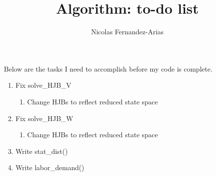 \documentclass[12pt,english]{article}
\theoremstyle{remark}
\begin{document}
\title{Algorithm: to-do list}
\author{Nicolas Fernandez-Arias}
\maketitle

Below are the tasks I need to accomplish before my code is complete.

\begin{enumerate}
	\item Fix solve\_HJB\_V
	\begin{enumerate}
		\item Change HJBs to reflect reduced state space
	\end{enumerate}
	\item Fix solve\_HJB\_W
	\begin{enumerate}
		\item Change HJBs to reflect reduced state space
	\end{enumerate}
	\item Write stat\_dist()
	\item Write labor\_demand() 
\end{enumerate}
\end{document}
